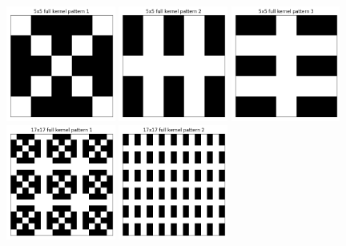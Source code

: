 \documentclass[a4paper]{article}
\begin{document}
	\begin{figure}[H]
		\centering
		\includegraphics[width=0.32\textwidth]{../../code/serialization/kernels/5x5/full/5x5_kernel_full_1.png}
		\includegraphics[width=0.32\textwidth]{../../code/serialization/kernels/5x5/full/5x5_kernel_full_2.png}
		\includegraphics[width=0.32\textwidth]{../../code/serialization/kernels/5x5/full/5x5_kernel_full_3.png}
		\includegraphics[width=0.32\textwidth]{../../code/serialization/kernels/17x17/full/17x17_kernel_full_1.png}
		\includegraphics[width=0.32\textwidth]{../../code/serialization/kernels/17x17/full/17x17_kernel_full_2.png}

\end{figure}
\end{document}
